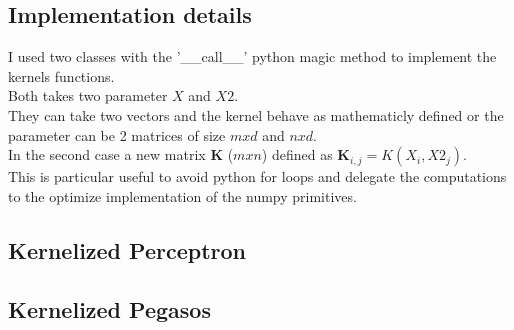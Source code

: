 \subsection{Implementation details}
I used two classes with the '\_\_call\_\_' python magic method to implement the kernels functions.\\
Both takes two parameter $X$ and $X2$.\\
They can take two vectors and the kernel behave as mathematicly defined or the parameter can be 2 matrices of size $m x d$ and $n x d$.\\
In the second case a new matrix $\boldsymbol{K}$ ($m x n$) defined as $\boldsymbol{K}_{i, j} = K(X_i, X2_j)$.\\
This is particular useful to avoid python for loops and delegate the computations to the optimize implementation of the numpy primitives.\\


\subsection{Kernelized Perceptron}
\subsection{Kernelized Pegasos}
